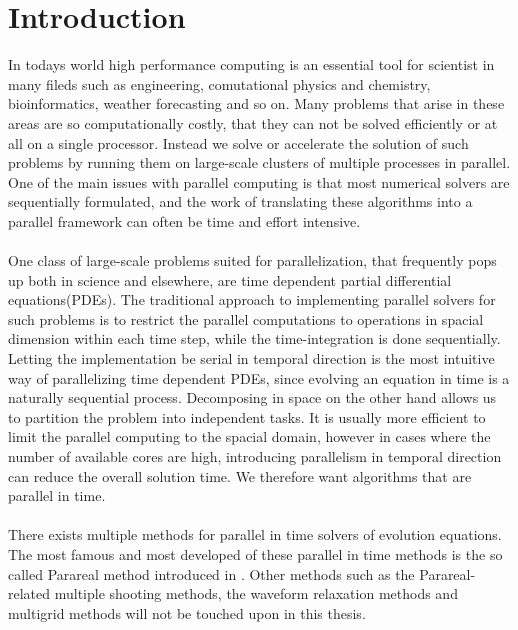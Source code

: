 \chapter{Introduction}
In todays world high performance computing is an essential tool for scientist in many fileds such as engineering, comutational physics and chemistry, bioinformatics, weather forecasting and so on. Many problems that arise in these areas are so computationally costly, that they can not be solved efficiently or at all on a single processor. Instead we solve or accelerate the solution of such problems by running them on large-scale clusters of multiple processes in parallel. One of the main issues with parallel computing is that most numerical solvers are sequentially formulated, and the work of translating these algorithms into a parallel framework can often be time and effort intensive.
\\
\\
One class of large-scale problems suited for parallelization, that frequently pops up both in science and elsewhere, are time dependent partial differential equations(PDEs). The traditional approach to implementing parallel solvers for such problems is to restrict the parallel computations to operations in spacial dimension within each time step, while the time-integration is done sequentially. Letting the implementation be serial in temporal direction is the most intuitive way of parallelizing time dependent PDEs, since evolving an equation in time is a naturally sequential process. Decomposing in space on the other hand allows us to partition the problem into independent tasks. It is usually more efficient to limit the parallel computing to the spacial domain, however in cases where the number of available cores are high, introducing parallelism in temporal direction can reduce the overall solution time. We therefore want algorithms that are parallel in time.
\\
\\
There exists multiple methods for parallel in time solvers of evolution equations. The most famous and most developed of these parallel in time methods is the so called Parareal method introduced in \cite{lions2001resolution}. Other methods such as the Parareal-related multiple shooting methods\cite{bellen1989parallel,nievergelt1964parallel}, the waveform relaxation methods\cite{lelarasmee1982waveform,gander1996overlapping} and multigrid methods\cite{hackbusch1985parabolic,lubich1987multi,horton1995space} will not be touched upon in this thesis. 
